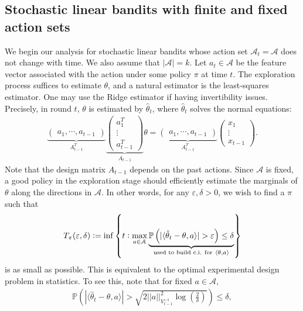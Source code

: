 \documentclass[10pt,a4article]{article}
\numberwithin{equation}{section}
\theoremstyle{plain}
\theoremstyle{definition}
\def\P{{\mathbb P}}
\def\e{{\varepsilon}}
\def\t{{\theta}}
\begin{document}
\subsection{Stochastic linear bandits with finite and fixed action sets}

We begin our analysis for stochastic linear bandits whose action set $\mathcal A_t = \mathcal A$ does not change with time. We also assume that $|\mathcal A|=k$. Let $a_t\in\mathcal A$ be the feature vector associated with the action under some policy $\pi$ at time $t$. The exploration process suffices to estimate $\t$, and a natural estimator is the least-squares estimator. One may use the Ridge estimator if having invertibility issues. Precisely, in round $t$, $\t$ is estimated by $\hat{\t}_t$, where $\hat{\t}_t $ solves the normal equations: 
\begin{align*}
\underbrace{\begin{pmatrix}
a_1, \cdots, a_{t-1}
\end{pmatrix}}_{A^T_{t-1}}\underbrace{\begin{pmatrix}
a_1^T \\
\vdots \\
a_{t-1}^T
\end{pmatrix}}_{A_{t-1}}\t = \underbrace{\begin{pmatrix}
a_1, \cdots, a_{t-1}
\end{pmatrix}}_{A^T_{t-1}}\begin{pmatrix}
x_1 \\
\vdots \\
x_{t-1}
\end{pmatrix}.
\end{align*}
Note that the design matrix $A_{t-1}$ depends on the past actions. Since $\mathcal A$ is fixed, a good policy in the exploration stage should efficiently estimate the marginals of $\t$ along the directions in $\mathcal A$. In other words, for any $\e, \delta>0$, we wish to find a $\pi$ such that 
\begin{align}
T_{\pi}(\e, \delta):=\inf\left\{t: \max_{a\in\mathcal A}\underbrace{\P\left(|\langle\hat{\t}_t-\t, a\rangle|>\e\right)\leq\delta}_{\textcolor{black}{\text{used to build c.i. for}\ \langle\t, a\rangle}}\right\}\label{sl:5}
\end{align}
is as small as possible. This is equivalent to the optimal experimental design problem in statistics. 
To see this, note that for fixed $a\in\mathcal A$, 
\begin{align*}
\P\left(|\langle\hat{\t}_t-\t, a\rangle|>\sqrt{2||a||^2_{V_{t-1}^{-1}}\log\left(\frac{2}{\delta}\right)}\right)\leq\delta,
\end{align*}
\end{document}
